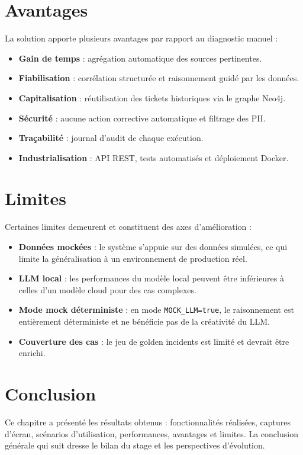 \section{Avantages}
La solution apporte plusieurs avantages par rapport au diagnostic manuel :

\begin{itemize}
    \setlength\itemsep{0.1em}
    \setlength\parskip{0pt}
    \setlength\parsep{0pt}
    \item \textbf{Gain de temps} : agrégation automatique des sources pertinentes.
    \item \textbf{Fiabilisation} : corrélation structurée et raisonnement guidé par les données.
    \item \textbf{Capitalisation} : réutilisation des tickets historiques via le graphe Neo4j.
    \item \textbf{Sécurité} : aucune action corrective automatique et filtrage des PII.
    \item \textbf{Traçabilité} : journal d'audit de chaque exécution.
    \item \textbf{Industrialisation} : API REST, tests automatisés et déploiement Docker.
\end{itemize}

\section{Limites}
Certaines limites demeurent et constituent des axes d'amélioration :

\begin{itemize}
    \setlength\itemsep{0.1em}
    \setlength\parskip{0pt}
    \setlength\parsep{0pt}
    \item \textbf{Données mockées} : le système s'appuie sur des données simulées, ce qui limite la généralisation à un environnement de production réel.
    \item \textbf{LLM local} : les performances du modèle local peuvent être inférieures à celles d'un modèle cloud pour des cas complexes.
    \item \textbf{Mode mock déterministe} : en mode \texttt{MOCK\_LLM=true}, le raisonnement est entièrement déterministe et ne bénéficie pas de la créativité du LLM.
    \item \textbf{Couverture des cas} : le jeu de golden incidents est limité et devrait être enrichi.
\end{itemize}

\section*{Conclusion}
Ce chapitre a présenté les résultats obtenus : fonctionnalités réalisées, captures d'écran, scénarios d'utilisation, performances, avantages et limites. La conclusion générale qui suit dresse le bilan du stage et les perspectives d'évolution.
